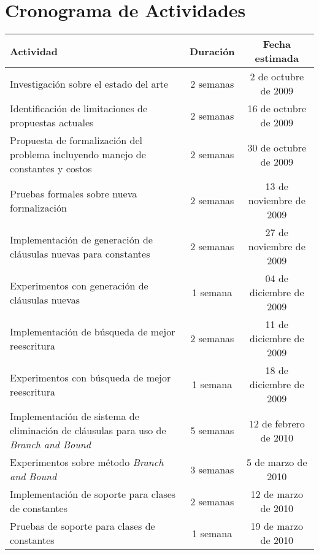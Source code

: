 \section{Cronograma de Actividades}

\begin{tabular}{|p{8cm}|c|c|}
\hline
Actividad & Duración & Fecha estimada \\
\hline
\hline
Investigación sobre el estado del arte & 2 semanas & 2 de octubre de 2009\\
\hline
Identificación de limitaciones de propuestas actuales & 2 semanas & 16 de octubre de 2009\\
\hline
Propuesta de formalización del problema incluyendo manejo de constantes y costos & 2 semanas & 30 de octubre de 2009 \\
\hline
Pruebas formales sobre nueva formalización & 2 semanas &  13 de noviembre de 2009 \\
\hline
Implementación de generación de cláusulas nuevas para constantes & 2 semanas & 27 de noviembre de 2009 \\
\hline
Experimentos con generación de cláusulas nuevas & 1 semana & 04 de diciembre de 2009 \\
\hline
Implementación de búsqueda de mejor reescritura & 2 semanas & 11 de diciembre de 2009 \\
\hline
Experimentos con búsqueda de mejor reescritura & 1 semana & 18 de diciembre de 2009 \\
\hline
Implementación de sistema de eliminación de cláusulas para uso de \emph{Branch and Bound} & 5 semanas & 12 de febrero de 2010 \\
\hline
Experimentos sobre método \emph{Branch and Bound} & 3 semanas & 5 de marzo de 2010 \\
\hline
Implementación de soporte para clases de constantes & 2 semanas & 12 de marzo de 2010 \\
\hline
Pruebas de soporte para clases de constantes & 1 semana & 19 de marzo de 2010 \\
\hline
\end{tabular}
